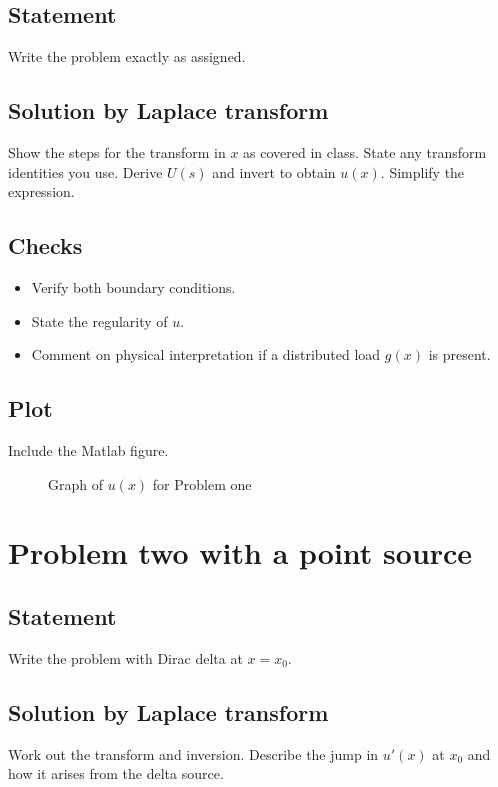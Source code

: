 \documentclass[12pt,a4paper]{article}
\begin{document}
\subsection{Statement}
Write the problem exactly as assigned.

\subsection{Solution by Laplace transform}
Show the steps for the transform in \(x\) as covered in class. State any transform identities you use. Derive \(U(s)\) and invert to obtain \(u(x)\). Simplify the expression.

\subsection{Checks}
\begin{itemize}[leftmargin=1.5em]
  \item Verify both boundary conditions.
  \item State the regularity of \(u\).
  \item Comment on physical interpretation if a distributed load \(g(x)\) is present.
\end{itemize}

\subsection{Plot}
Include the Matlab figure.
\begin{figure}[h]
  \centering
  \caption{Graph of \(u(x)\) for Problem one}
\end{figure}

\section{Problem two with a point source}
\subsection{Statement}
Write the problem with Dirac delta at \(x=x_{0}\).

\subsection{Solution by Laplace transform}
Work out the transform and inversion. Describe the jump in \(u'(x)\) at \(x_{0}\) and how it arises from the delta source.
\end{document}
